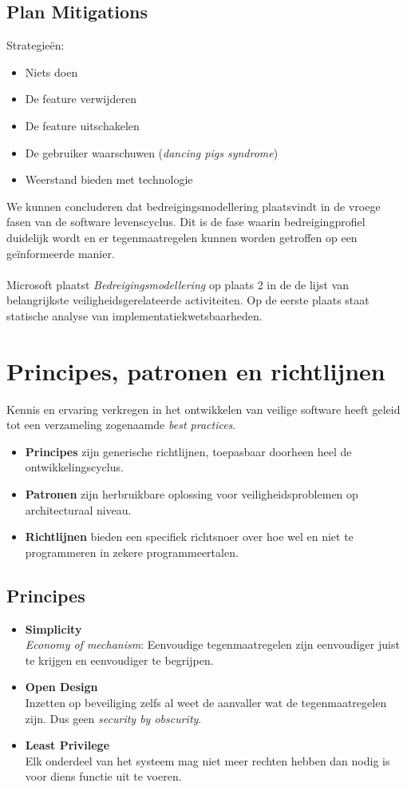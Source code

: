 \documentclass[../main.tex]{subfiles}
\begin{document}
\subsection{Plan Mitigations}
Strategie\"en:
\begin{itemize}
	\item Niets doen
	\item De feature verwijderen
	\item De feature uitschakelen
	\item De gebruiker waarschuwen (\textit{dancing pigs syndrome})
	\item Weerstand bieden met technologie
\end{itemize} 

We kunnen concluderen dat bedreigingsmodellering  plaatsvindt in de vroege fasen van de software levenscyclus. Dit is de fase waarin bedreigingprofiel duidelijk wordt en er tegenmaatregelen kunnen worden getroffen op een ge\"informeerde manier. 
\\\\
Microsoft plaatst \textit{Bedreigingsmodellering} op plaats 2 in de de lijst van belangrijkste veiligheidsgerelateerde activiteiten. Op de eerste plaats staat statische analyse van implementatiekwetsbaarheden.

\section{Principes, patronen en richtlijnen}
Kennis en ervaring verkregen in het ontwikkelen van veilige software heeft geleid tot een verzameling zogenaamde \textit{best practices}. 
\begin{itemize}
	\item \textbf{Principes} zijn generische richtlijnen, toepasbaar doorheen heel de ontwikkelingscyclus.
	\item \textbf{Patronen} zijn herbruikbare oplossing voor veiligheidsproblemen op architecturaal niveau.
	\item \textbf{Richtlijnen} bieden een specifiek richtsnoer over hoe wel en niet te programmeren in zekere programmeertalen. 
\end{itemize}

\subsection{Principes}
\begin{itemize}
	\item \textbf{Simplicity} \\ 
	\textit{Economy of mechanism}: Eenvoudige tegenmaatregelen zijn eenvoudiger juist te krijgen en eenvoudiger te begrijpen.
	\item \textbf{Open Design} \\
	Inzetten op beveiliging zelfs al weet de aanvaller wat de tegenmaatregelen zijn. Dus geen  \textit{security by obscurity}.
	\item \textbf{Least Privilege} \\ 
	Elk onderdeel van het systeem mag niet meer rechten hebben dan nodig is voor diens functie uit te voeren.
\end{itemize}
\end{document}
